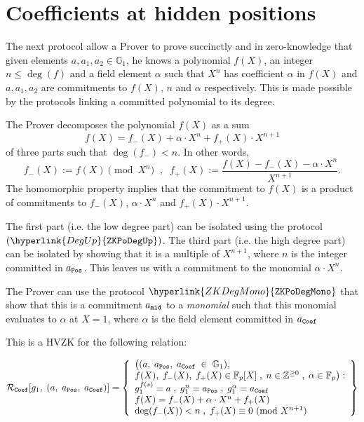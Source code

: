 \documentclass[11pt, lettersize, notitlepage, leqno, footskip=0.6cm]{article}
\newcommand{\bz}{\mathbb Z}
\newcommand{\bFp}{\mathbb{F}_p}
\newcommand{\mc}{\mathcal}
\newcommand{\mb}{\mathbb}
\newcommand{\al}{\alpha}
\newcommand{\vs}{\vspace{-0.15cm}}
\newcommand{\Mod}[1]{\ (\mathrm{mod}\ #1)}
\numberwithin{equation}{section}
\begin{document}
\bigskip









\section{\fontsize{11}{11}\selectfont Coefficients at hidden positions}







The next protocol allow a Prover to prove succinctly and in zero-knowledge that given elements $a,a_1,a_2\in \mb{G}_1$, he knows a polynomial $f(X)$, an integer $n\leq \deg(f)$ and a field element $\al$ such that $X^n$ has coefficient $\al$ in $f(X)$ and $a,a_1,a_2$ are commitments to $f(X)$, $n$ and $\al$ respectively. This is made possible by the protocols linking a committed polynomial to its degree.

The Prover decomposes the polynomial $f(X)$ as a sum \vs $$f(X) = f_{-}(X) + \al \cdot X^n +  f_{+}(X) \cdot X^{n+1} $$ of three parts such that $\deg(f_{-})< n$. In other words, \vs $$f_{-}(X):= f(X)\pmod{X^n}\;\;,\;\;f_{+}(X):= \frac{f(X)-f_{-}(X) - \al\cdot X^n}{X^{n+1}}. $$ The homomorphic property implies that the  commitment to $f(X)$ is a product of commitments to $f_{-}(X)$, $\al\cdot X^n$ and $f_{+}(X)\cdot X^{n+1}$. 

The first part (i.e. the low degree part) can be isolated using the protocol $(\hyperlink{DegUp}{\tt{ZKPoDegUp}})$. The third part (i.e. the high degree part) can be isolated by showing that it is a multiple of $X^{n+1}$, where $n$ is the integer committed in $a_{\tt{Pos}}$. This leaves us with a commitment to the monomial $\al\cdot X^n$. 

The Prover can use the protocol $\hyperlink{ZKDegMono}{\tt{ZKPoDegMono}}$ that show that this is a commitment $a_{\tt{mid}}$ to a \textit{monomial} such that this monomial evaluates to $\al$ at $X = 1$, where $\al$ is the field element committed in $a_{\tt{Coef}}$ \vspace{1mm}



This is a HVZK for the following relation:

\vspace{-4mm} $$\mc{R}_{\tt{Coef}}[g_1,\;(a,\;a_{\tt{Pos}},\;a_{\tt{Coef}})] = \left\{\begin{array}{l} 
\big((a,\;a_{\tt{Pos}},\;a_{\tt{Coef}}\;\in\;\mb{G}_1),\\ f(X),\; f_{-}(X),\; f_{+}(X)\in \bFp[X]\;,\;n\in \bz^{\geq 0}\;,\;\al \in \bFp \big):\\ g_1^{f(s)} = a\;,\; g_1^{n} = a_{\tt{Pos}}\;,\; g_1^{\al} = a_{\tt{Coef}}  
\\ f(X) = f_{-}(X) + \al\cdot X^n + f_{+}(X)\\
\deg(f_{-}(X)) < n\;,\; f_{+}(X)\equiv 0 \Mod{X^{n+1}} \end{array}\right\} \vs $$ 
\end{document}
